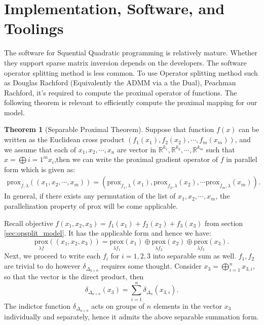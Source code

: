 \documentclass[11pt]{article}
\theoremstyle{definition}
\newtheorem{theorem}{Theorem}       %
\numberwithin{equation}{subsection}
\begin{document}
\section{Implementation, Software, and Toolings}
    The software for Squential Quadratic programming is relatively mature. 
    Whether they support sparse matrix inversion depends on the developers. 
    The software operator splitting method is less common.
    To use Operator splitting method such as Douglas Rachford (Equivalently the ADMM via a the Dual), Peachman Rachford, it's required to compute the proximal operator of functions. 
    The following theorem is relevant to efficiently compute the proximal mapping for our model. 
    \begin{theorem}[Separable Proximal Theorem]
        Suppose that function $f(x)$ can be written as the Euclidean cross product $(f_1(x_1), f_2(x_2), \cdots, f_m(x_m))$, and we assume that each of $x_1, x_2, \cdots, x_n$ are vector in $\mathbb R^{k_1}, \mathbb R^{k_2}, \cdots, \mathbb R^{k_m}$ such that $x =\bigoplus{i=1}^m x_i$,then we can write the proximal gradient operator of $f$ in parallel form which is given as: 
        $$
        \begin{aligned}
            \text{prox}_{f, \lambda}((x_1, x_2, \cdots, x_m)) = 
            (\text{prox}_{f_1, \lambda}(x_1), \text{prox}_{f_2, \lambda}(x_2), \cdots \text{prox}_{f_m, \lambda}(x_m)).
        \end{aligned}
        $$
        In general, if there exists any permutation of the list of $x_1, x_2, \cdots, x_m$, the parallelization property of prox will be come applicable.     
    \end{theorem}
    Recall objective $f(x_1, x_2, x_3) = f_1(x_1) + f_2(x_2) + f_3(x_3)$ from section \ref*{sec:opsplit_model}. It has the applicable form and hence we have:     
    \[
        \underset{\lambda f}{\text{prox}}((x_1, x_2, x_3))
        = 
        \underset{\lambda f_1}{\text{prox}}(x_1) \oplus
        \underset{\lambda f_2}{\text{prox}}(x_2) \oplus
        \underset{\lambda f_3}{\text{prox}}(x_3). 
    \]
    Next, we proceed to write each $f_i$ for $i = 1, 2, 3$ into separable sum as well. 
    $f_1, f_2$ are trivial to do however $\delta_{\Delta_{n\times n}}$ requires some thought. 
    Consider $x_3 = \bigoplus_{i = 1}^n x_{3, i}$, so that the vector is the direct product, then     
    \[
        \delta_{\Delta_{n\times n}}(x_3) = 
        \sum_{i = 1}^{n} \delta_{\Delta_n}(x_{3, i}). 
    \]
    The indictor function $\delta_{\Delta_{n\times n}}$ acts on groups of $n$ elements in the vector $x_3$ individually and separately, hence it admits the above separable summation form. 
\end{document}
